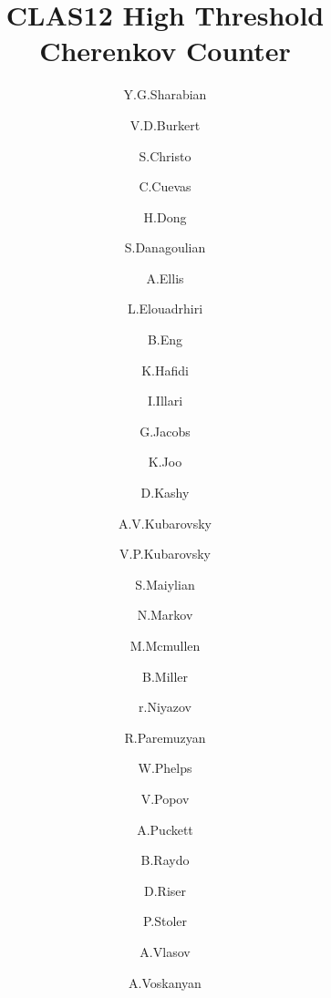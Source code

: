 \title{CLAS12 High Threshold Cherenkov Counter}

\author[1]{Y.G.Sharabian}
\author[1]{V.D.Burkert}
\author[1]{S.Christo}
\author[1]{C.Cuevas}
\author[1]{H.Dong}
\author[13]{S.Danagoulian}
\author[2]{A.Ellis}
\author[1]{L.Elouadrhiri}
\author[1]{B.Eng}
\author[3]{K.Hafidi}
\author[4]{I.Illari}
\author[1]{G.Jacobs}
\author[5]{K.Joo}
\author[1]{D.Kashy}
\author[6]{A.V.Kubarovsky}
\author[1]{V.P.Kubarovsky}
\author[7]{S.Maiylian}
\author[1]{N.Markov}
\author[1]{M.Mcmullen}
\author[1]{B.Miller}
\author[8]{r.Niyazov}
\author[7]{R.Paremuzyan}
\author[9]{W.Phelps}
\author[1]{V.Popov}
\author[10]{A.Puckett}
\author[1]{B.Raydo}
\author[11]{D.Riser}
\author[12]{P.Stoler}
\author[13]{A.Vlasov}
\author[7]{A.Voskanyan}

\address[1]{Placeholder location}
\address[2]{Placeholder location}
\address[3]{Placeholder location}
\address[4]{Placeholder location}
\address[5]{Placeholder location}